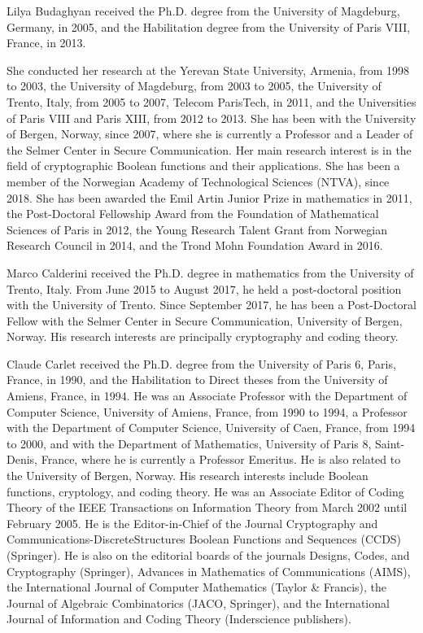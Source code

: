 \documentclass[10pt]{article}
\begin{document}
Lilya Budaghyan received the Ph.D. degree from the University of Magdeburg, Germany, in 2005, and the Habilitation degree from the University of Paris VIII, France, in 2013.

She conducted her research at the Yerevan State University, Armenia, from 1998 to 2003, the University of Magdeburg, from 2003 to 2005, the University of Trento, Italy, from 2005 to 2007, Telecom ParisTech, in 2011, and the Universities of Paris VIII and Paris XIII, from 2012 to 2013. She has been with the University of Bergen, Norway, since 2007, where she is currently a Professor and a Leader of the Selmer Center in Secure Communication. Her main research interest is in the field of cryptographic Boolean functions and their applications. She has been a member of the Norwegian Academy of Technological Sciences (NTVA), since 2018. She has been awarded the Emil Artin Junior Prize in mathematics in 2011, the Post-Doctoral Fellowship Award from the Foundation of Mathematical Sciences of Paris in 2012, the Young Research Talent Grant from Norwegian Research Council in 2014, and the Trond Mohn Foundation Award in 2016.

Marco Calderini received the Ph.D. degree in mathematics from the University of Trento, Italy. From June 2015 to August 2017, he held a post-doctoral position with the University of Trento. Since September 2017, he has been a Post-Doctoral Fellow with the Selmer Center in Secure Communication, University of Bergen, Norway. His research interests are principally cryptography and coding theory.

Claude Carlet received the Ph.D. degree from the University of Paris 6, Paris, France, in 1990, and the Habilitation to Direct theses from the University of Amiens, France, in 1994. He was an Associate Professor with the Department of Computer Science, University of Amiens, France, from 1990 to 1994, a Professor with the Department of Computer Science, University of Caen, France, from 1994 to 2000, and with the Department of Mathematics, University of Paris 8, Saint-Denis, France, where he is currently a Professor Emeritus. He is also related to the University of Bergen, Norway. His research interests include Boolean functions, cryptology, and coding theory. He was an Associate Editor of Coding Theory of the IEEE Transactions on Information Theory from March 2002 until February 2005. He is the Editor-in-Chief of the Journal Cryptography and Communications-DiscreteStructures Boolean Functions and Sequences (CCDS) (Springer). He is also on the editorial boards of the journals Designs, Codes, and Cryptography (Springer), Advances in Mathematics of Communications (AIMS), the International Journal of Computer Mathematics (Taylor \& Francis), the Journal of Algebraic Combinatorics (JACO, Springer), and the International Journal of Information and Coding Theory (Inderscience publishers).
\end{document}
